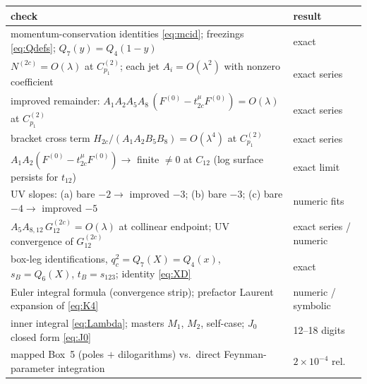 \documentclass[11pt]{article}
\begin{document}
\begin{center}
\small
\begin{tabular}{ll}
\toprule
check & result\\
\midrule
momentum-conservation identities \eqref{eq:mcid}; freezings \eqref{eq:Qdefs}; $Q_7(y)=Q_4(1-y)$ & exact\\
$N^{(2c)}=O(\lambda)$ at $C^{(2)}_{p_1}$; each jet $A_i=O(\lambda^2)$ with nonzero coefficient & exact series\\
improved remainder: $A_1A_2A_5A_8\,(F^{(0)}-t^\mu_{2c}F^{(0)})=O(\lambda)$ at $C^{(2)}_{p_1}$ & exact series\\
bracket cross term $H_{2c}/(A_1A_2B_5B_8)=O(\lambda^4)$ at $C^{(2)}_{p_1}$ & exact series\\
$A_1A_2(F^{(0)}-t^\mu_{2c}F^{(0)})\to$ finite $\neq0$ at $C_{12}$ (log surface persists for $t_{12}$) & exact limit\\
UV slopes: (a) bare $-2\to$ improved $-3$; (b) bare $-3$; (c) bare $-4\to$ improved $-5$ & numeric fits\\
$A_5A_{8,12}\,G^{(2c)}_{12}=O(\lambda)$ at collinear endpoint; UV convergence of $G^{(2c)}_{12}$ & exact series / numeric\\
box-leg identifications, $q_c^2=Q_7(X)=Q_4(x)$, $s_B=Q_6(X)$, $t_B=s_{123}$; identity \eqref{eq:XD} & exact\\
Euler integral formula (convergence strip); prefactor Laurent expansion of \eqref{eq:K4} & numeric / symbolic\\
inner integral \eqref{eq:Lambda}; masters $M_1$, $M_2$, self-case; $J_0$ closed form \eqref{eq:J0} & 12--18 digits\\
mapped Box~5 (poles $+$ dilogarithms) vs.\ direct Feynman-parameter integration & $2\times10^{-4}$ rel.\\
\bottomrule
\end{tabular}
\end{center}
\end{document}
